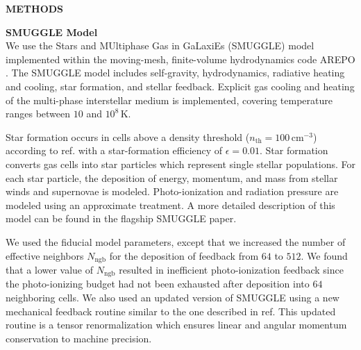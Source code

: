 \documentclass{natureprintstyle}
\begin{document}

\newpage

\setcounter{page}{1}
\setcounter{figure}{0}
\setcounter{table}{0}
\renewcommand{\figurename}{Extended Data Figure}
\renewcommand{\thetable}{Extended Data \arabic{table}}

\begin{center}
{\bf \Large \uppercase{Methods} }
\end{center}

\noindent
{\bf SMUGGLE Model}
\\
\noindent
We use the Stars and MUltiphase Gas in GaLaxiEs (SMUGGLE) model
\cite{2019MNRAS.489.4233M} implemented within the moving-mesh, finite-volume
hydrodynamics code AREPO \cite{2010MNRAS.401..791S}. The SMUGGLE model
includes self-gravity, hydrodynamics, radiative heating and cooling, star
formation, and stellar feedback. Explicit gas cooling and heating of the
multi-phase interstellar medium is implemented, covering temperature ranges
between $10$ and $10^8\,\textrm{K}$.

Star formation occurs in cells above a density threshold
($n_{\textrm{th}}=100\,\textrm{cm}^{-3}$) according to
ref.\cite{2003MNRAS.339..289S} with a star-formation efficiency of $\epsilon =
0.01$. Star formation converts gas cells into star particles which represent
single stellar populations. For each star particle, the deposition of energy,
momentum, and mass from stellar winds and supernovae is modeled.
Photo-ionization and radiation pressure are modeled using an approximate
treatment. A more detailed description of this model can be found in the
flagship SMUGGLE paper.\cite{2019MNRAS.489.4233M}

We used the fiducial model parameters, except that we increased the number of
effective neighbors $N_{\textrm{ngb}}$ for the deposition of feedback from
$64$ to $512$. We found that a lower value of $N_{\textrm{ngb}}$ resulted in
inefficient photo-ionization feedback since the photo-ionizing budget had not
been exhausted after deposition into $64$ neighboring cells. We also used an
updated version of SMUGGLE using a new mechanical feedback routine similar to
the one described in ref.\cite{2018MNRAS.480..800H} This updated routine is a
tensor renormalization which ensures linear and angular momentum conservation
to machine precision.

\vspace{12pt}
\end{document}
